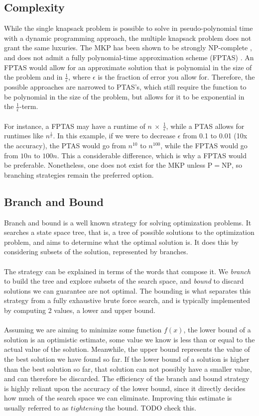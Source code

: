 \documentclass[b5paper]{article}
\begin{document}
\subsection{Complexity}
While the single knapsack problem is possible to solve in pseudo-polynomial time with a dynamic programming approach, the multiple knapsack problem does not grant the same luxuries.
The MKP has been shown to be strongly NP-complete \cite{zhang_complexity_1986}, and does not admit a fully polynomial-time approximation scheme (FPTAS) \cite{kellerer_knapsack_2004}.
An FPTAS would allow for an approximate solution that is polynomial in the size of the problem and in $\frac{1}{\epsilon}$, where $\epsilon$ is the fraction of error you allow for.
Therefore, the possible approaches are narrowed to PTAS's, which still require the function to be polynomial in the size of the problem, but allows for it to be exponential in the $\frac{1}{\epsilon}$-term.
\\ \\
For instance, a FPTAS may have a runtime of $n \: \times \: \frac{1}{\epsilon}$,
while a PTAS allows for runtimes like $n^{\frac{1}{\epsilon}}$.
In this example, if we were to decrease $\epsilon$ from 0.1 to 0.01 (10x the accuracy),
the PTAS would go from $n^{10}$ to $n^{100}$, while the FPTAS would go from $10n$ to $100n$.
This a considerable difference, which is why a FPTAS would be preferable.
Nonetheless, one does not exist for the MKP unless $\mathrm{P}=\mathrm{NP}$, so branching strategies remain the preferred option.

\subsection{Branch and Bound}
Branch and bound is a well known strategy for solving optimization problems.
It searches a state space tree, that is, a tree of possible solutions to the optimization problem,
and aims to determine what the optimal solution is. It does this by considering subsets of the solution,
represented by branches.
\\  \\
The strategy can be explained in terms of the words that compose it.
We \emph{branch} to build the tree and explore subsets of the search space,
and \emph{bound} to discard solutions we can guarantee are not optimal.
The bounding is what separates this strategy from a fully exhaustive brute force search,
and is typically implemented by computing 2 values, a lower and upper bound.
\\ \\
Assuming we are aiming to minimize some function $f(x)$, the lower bound of a solution is an optimistic estimate,
some value we know is less than or equal to the actual value of the solution. Meanwhile, the upper bound represents the
value of the best solution we have found so far. If the lower bound of a solution is higher than the best solution so far,
that solution can not possibly have a smaller value, and can therefore be discarded. The efficiency of the branch and bound strategy
is highly reliant upon the accuracy of the lower bound, since it directly decides how much of the search space we can eliminate.
Improving this estimate is usually referred to as $tightening$ the bound. TODO check this.
\end{document}
